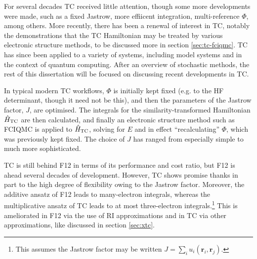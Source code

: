 For several decades TC received little attention, though some more developments were made, such as a fixed Jastrow, more effiicent integration, multi-reference $\Phi$, among others. More recently, there has been a renewal of interest in TC, notably the demonstrations that the TC Hamiltonian may be treated by various electronic structure methods, to be discussed more in section \ref{sec:tc-fciqmc}. TC has since been applied to a variety of systems, including model systems and in the context of quantum computing. After an overview of stochastic methods, the rest of this dissertation will be focused on discussing recent developments in TC.

In typical modern TC workflows, $\Phi$ is initially kept fixed (e.g. to the \gls{HF} determinant, though it need not be this), and then the parameters of the Jastrow factor, $J$, are optimised. The integrals for the similarity-transformed Hamiltonian $\hat H_\mathrm{TC}$ are then calculated, and finally an electronic structure method such as \gls{FCIQMC} is applied to $\hat H_\mathrm{TC}$, solving for $E$ and in effect ``recalculating'' $\Phi$, which was previously kept fixed. The choice of $J$ has ranged from especially simple to much more sophisticated.\supercite{drummondJastrow2004,lopezriosFrameworkConstructingGeneric2012,cohenSimilarity2019}

TC is still behind F12 in terms of its performance and cost ratio, but F12 is ahead several decades of development. However, TC shows promise thanks in part to the high degree of flexibility owing to the Jastrow factor. Moreover, the additive ansatz of F12 leads to many-electron integrals, whereas the multiplicative ansatz of TC leads to at most three-electron integrals.\footnote{This assumes the Jastrow factor may be written $J=\sum_iu_i(\bm r_i, \bm r_j)$.} This is ameliorated in F12 via the use of \gls{RI} approximations and in TC via other approximations, like discussed in section \ref{sec:xtc}.
